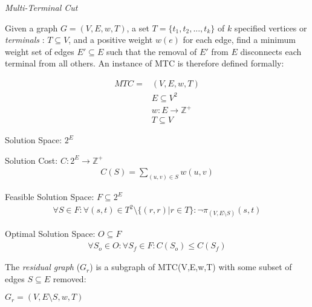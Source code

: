 \documentclass{article}
\begin{document}
\begin{definition}
{\em Multi-Terminal Cut}

Given a graph $G=(V,E,w,T)$, a set $T=\{t_1, t_2, ..., t_k\}$ of $k$ specified vertices or {\em terminals} : $T \subseteq V$, and a positive weight $w(e)$ for each edge, find a minimum weight set of edges $E' \subseteq E$ such that the removal of $E'$ from $E$ disconnects each terminal from all others.
An instance of MTC is therefore defined formally:

\begin{align}
	\nonumber MTC = & (V,E,w,T)\\
	\nonumber & E \subseteq V^2\\
	\nonumber & w : E \rightarrow \mathbb{Z}^+\\
	\nonumber & T \subseteq V
\end{align}

Solution Space: $2^E$

Solution Cost: $C : 2^E \rightarrow \mathbb{Z}^+$
\begin{align}
	\nonumber C(S) = \displaystyle\sum\limits_{(u,v) \in S} w(u,v)
\end{align}

Feasible Solution Space: $F \subseteq 2^E$
\begin{align}
	\nonumber \forall S \in F : \forall (s, t) \in T^2 \setminus \{(r, r) | r \in T\} : \neg\pi_{(V, E \setminus S)}(s, t)
\end{align}

Optimal Solution Space: $O \subseteq F$
\begin{align}
	\forall S_o \in O : \forall S_f \in F : \nonumber C(S_o) \leq C(S_f)
\end{align}

\end{definition}

\begin{definition}
The {\em residual graph} ($G_r$) is a subgraph of MTC(V,E,w,T) with some subset of edges $S \subseteq E$ removed:

$G_r = (V, E \setminus S, w, T)$
\end{definition}
\end{document}
